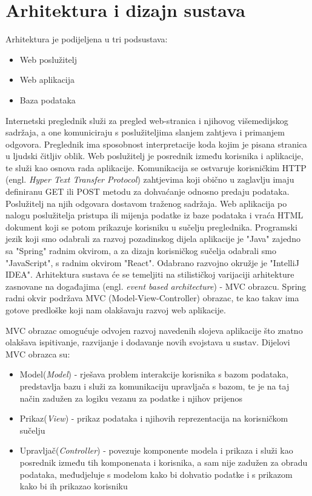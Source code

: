 \chapter{Arhitektura i dizajn sustava}		
Arhitektura je podijeljena u tri podsustava:

\begin{itemize}
	\item Web poslužitelj
	\item Web aplikacija
	\item Baza podataka
\end{itemize}

\indent Internetski preglednik služi za pregled web-stranica i njihovog višemedijskog sadržaja, a one komuniciraju s poslužiteljima slanjem zahtjeva i primanjem odgovora. Preglednik ima sposobnost interpretacije koda kojim je pisana stranica u ljudski čitljiv oblik.
\newline
\indent Web poslužitelj je posrednik između korisnika i aplikacije, te služi kao osnova rada aplikacije. Komunikacija se ostvaruje korisničkim HTTP (engl. \textit{Hyper Text Transfer Protocol}) zahtjevima koji obično u zaglavlju imaju definiranu GET ili POST metodu za dohvaćanje odnosno predaju podataka. Poslužitelj na njih odgovara dostavom traženog sadržaja.
\newline
\indent Web aplikacija po nalogu poslužitelja pristupa ili mijenja podatke iz baze podataka i vraća HTML dokument koji se potom prikazuje korisniku u sučelju preglednika.
Programski jezik koji smo odabrali za razvoj pozadinskog dijela aplikacije je "Java" zajedno sa "Spring" radnim okvirom, a za dizajn korisničkog sučelja odabrali smo "JavaScript", s radnim okvirom "React". Odabrano razvojno okružje je "IntelliJ IDEA". Arhitektura sustava će se temeljiti na stilističkoj varijaciji arhitekture zasnovane na događajima (engl. \textit{event based architecture}) - MVC obrazcu. Spring radni okvir podržava MVC (Model-View-Controller) obrazac, te kao takav ima gotove predloške koji nam olakšavaju razvoj web aplikacije.
\newline

\clearpage
\indent MVC obrazac omogućuje odvojen razvoj navedenih slojeva aplikacije što znatno olakšava ispitivanje, razvijanje i dodavanje novih svojstava u sustav.
\newline
Dijelovi MVC obrazca su:
\begin{itemize}
	\item Model(\textit{Model}) - rješava problem interakcije korisnika s bazom podataka, predstavlja bazu i služi za komunikaciju upravljača s bazom, te je na taj način zadužen za logiku vezanu za podatke i njihov prijenos
	\item Prikaz(\textit{View}) - prikaz podataka i njihovih reprezentacija na korisničkom sučelju
	\item Upravljač(\textit{Controller}) - povezuje komponente modela i prikaza i služi kao posrednik između tih komponenata i korisnika, a sam nije zadužen za obradu podataka, međudjeluje s modelom kako bi dohvatio podatke i s prikazom kako bi ih prikazao korisniku
\end{itemize}


